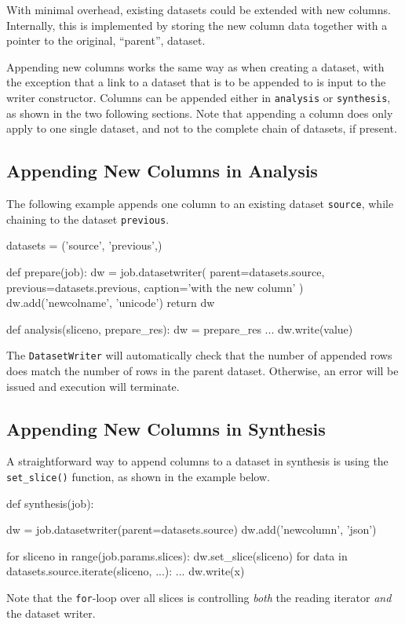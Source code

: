 With minimal overhead, existing datasets could be extended with new
columns.  Internally, this is implemented by storing the new column
data together with a pointer to the original, ``parent'', dataset.

Appending new columns works the same way as when creating a dataset,
with the exception that a link to a dataset that is to be appended to
is input to the writer constructor.  Columns can be appended either
in \texttt{analysis} or \texttt{synthesis}, as shown in the two
following sections.  Note that appending a column does only apply to
one single dataset, and not to the complete chain of datasets, if
present.


\subsection{Appending New Columns in Analysis}

The following example appends one column to an existing
dataset \texttt{source}, while chaining to the
dataset \texttt{previous}.
\begin{python}
datasets = ('source', 'previous',)

def prepare(job):
    dw = job.datasetwriter(
        parent=datasets.source,
        previous=datasets.previous,
        caption='with the new column'
    )
    dw.add('newcolname', 'unicode')
    return dw

def analysis(sliceno, prepare_res):
    dw = prepare_res
    ...
    dw.write(value)
\end{python}
The \texttt{DatasetWriter} will automatically check that the number of
appended rows does match the number of rows in the parent dataset.
Otherwise, an error will be issued and execution will terminate.


\subsection{Appending New Columns in Synthesis}

A straightforward way to append columns to a dataset in synthesis is
using the \texttt{set\_slice()} function, as shown in the example
below.
\begin{python}
def synthesis(job):

    dw = job.datasetwriter(parent=datasets.source)
    dw.add('newcolumn', 'json')
    
    for sliceno in range(job.params.slices):
        dw.set_slice(sliceno)
        for data in datasets.source.iterate(sliceno, ...):
            ...
            dw.write(x)
\end{python}
Note that the \texttt{for}-loop over all slices is
controlling \textsl{both} the reading iterator \textsl{and} the
dataset writer.
